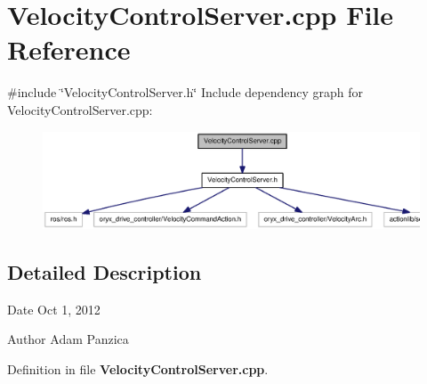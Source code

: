 \section{\-Velocity\-Control\-Server.\-cpp \-File \-Reference}
\label{VelocityControlServer_8cpp}
{\ttfamily \#include \char`\"{}\-Velocity\-Control\-Server.\-h\char`\"{}}\*
\-Include dependency graph for \-Velocity\-Control\-Server.\-cpp\-:
\nopagebreak
\begin{figure}[H]
\begin{center}
\leavevmode
\includegraphics[width=350pt]{VelocityControlServer_8cpp__incl}
\end{center}
\end{figure}


\subsection{\-Detailed \-Description}
\begin{DoxyDate}{\-Date}
\-Oct 1, 2012 
\end{DoxyDate}
\begin{DoxyAuthor}{\-Author}
\-Adam \-Panzica 
\end{DoxyAuthor}


\-Definition in file {\bf \-Velocity\-Control\-Server.\-cpp}.

